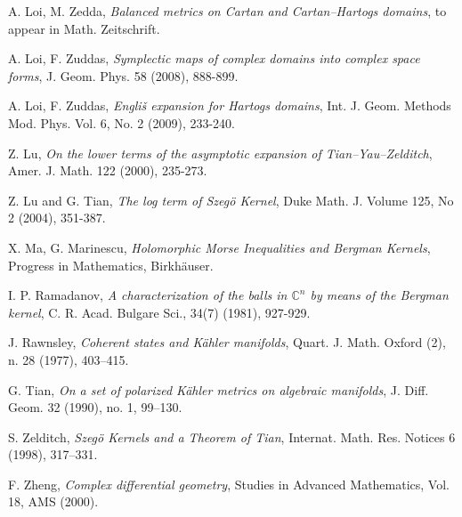 \documentclass[11pt, reqno]{amsart}
\begin{document}
\begin{thebibliography}{99}
 A. Loi, M. Zedda, \emph{Balanced metrics on Cartan and Cartan--Hartogs domains}, to appear in  Math. Zeitschrift.

 A. Loi, F. Zuddas,
{\em Symplectic maps of complex domains into complex space forms},
J. Geom. Phys. 58  (2008), 888-899.

 A. Loi, F. Zuddas,
{\em Engli\v{s} expansion for Hartogs domains},
Int. J.   Geom. Methods  Mod. Phys.
Vol. 6, No. 2 (2009),  233-240.

 Z. Lu,
{\em On the lower terms of the asymptotic expansion of Tian--Yau--Zelditch},
Amer. J. Math. 122 (2000),  235-273.

 Z. Lu and G. Tian,
{\em The log term of Szeg\"{o} Kernel}, Duke Math. J. Volume 125,
No 2 (2004), 351-387.

 X. Ma, G. Marinescu, \emph{Holomorphic Morse Inequalities and Bergman Kernels}, Progress in Mathematics, Birkh\"{a}user.

     I. P. Ramadanov,
{\em A characterization of the balls in ${\mathbb{C}}^n$ by means of the Bergman kernel}, C. R. Acad. Bulgare Sci., 34(7) (1981), 927-929.

 J. Rawnsley, \emph{Coherent states and K\"ahler manifolds}, Quart. J. Math. Oxford (2), n. 28 (1977), 403--415.

G. Tian,
{\em On a set of polarized K\"ahler metrics on algebraic manifolds},
J. Diff. Geom. 32 (1990), no. 1, 99--130.

 S. Zelditch,
{\em Szeg\"{o} Kernels and a Theorem of Tian},
Internat. Math. Res. Notices  6 (1998), 317--331.

  F. Zheng,
{\em Complex differential geometry}, Studies in Advanced
Mathematics, Vol. 18, AMS (2000).

\end{thebibliography}
\end{document}

